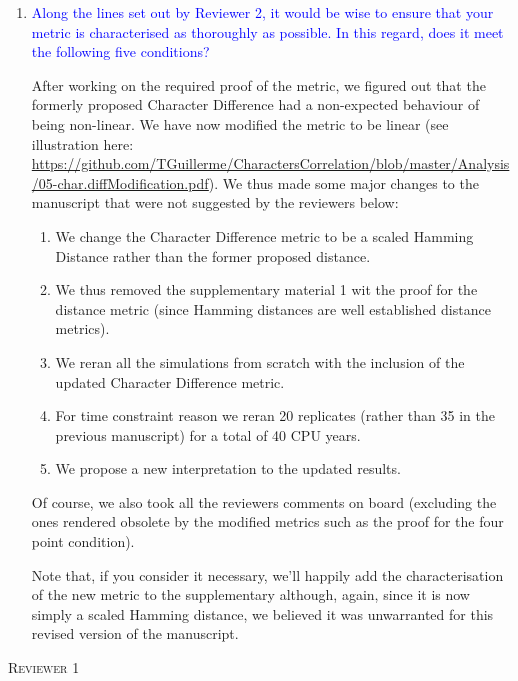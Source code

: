 \documentclass[12pt,letterpaper]{article}
\renewcommand{\section}[1]{%
\bigskip
\begin{center}
\begin{Large}
\normalfont\scshape #1
\medskip
\end{Large}
\end{center}}
\begin{document}
\begin{enumerate}

\item{\textcolor{blue}{Along the lines set out by Reviewer 2, it would be wise to ensure that your metric is characterised as thoroughly as possible. In this regard, does it meet the following five conditions?}}

After working on the required proof of the metric, we figured out that the formerly proposed Character Difference had a non-expected behaviour of being non-linear.
We have now modified the metric to be linear (see illustration here: \url{https://github.com/TGuillerme/CharactersCorrelation/blob/master/Analysis/05-char.diffModification.pdf}).
We thus made some major changes to the manuscript that were not suggested by the reviewers below:
\begin{enumerate}
    \item We change the Character Difference metric to be a scaled Hamming Distance rather than the former proposed distance.
    \item We thus removed the supplementary material 1 wit the proof for the distance metric (since Hamming distances are well established distance metrics).
    \item We reran all the simulations from scratch with the inclusion of the updated Character Difference metric.
    \item For time constraint reason we reran 20 replicates (rather than 35 in the previous manuscript) for a total of 40 CPU years.
    \item We propose a new interpretation to the updated results.
\end{enumerate}

Of course, we also took all the reviewers comments on board (excluding the ones rendered obsolete by the modified metrics such as the proof for the four point condition).

Note that, if you consider it necessary, we'll happily add the characterisation of the new metric to the supplementary although, again, since it is now simply a scaled Hamming distance, we believed it was unwarranted for this revised version of the manuscript. 


\end{enumerate}

%
%


\section{Reviewer 1}
\end{document}

